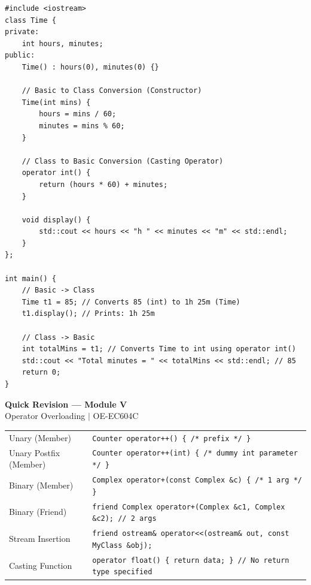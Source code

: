 \documentclass[12pt,a4paper]{article}
\renewcommand{\arraystretch}{1.45}
\begin{document}
\begin{tcolorbox}[examplebox, title={Code Example: Basic-to-Class and Class-to-Basic conversions}]
\begin{spacing}{1.0}
\begin{verbatim}
#include <iostream>
class Time {
private:
    int hours, minutes;
public:
    Time() : hours(0), minutes(0) {}
    
    // Basic to Class Conversion (Constructor)
    Time(int mins) {
        hours = mins / 60;
        minutes = mins % 60;
    }
    
    // Class to Basic Conversion (Casting Operator)
    operator int() {
        return (hours * 60) + minutes;
    }
    
    void display() {
        std::cout << hours << "h " << minutes << "m" << std::endl;
    }
};

int main() {
    // Basic -> Class
    Time t1 = 85; // Converts 85 (int) to 1h 25m (Time)
    t1.display(); // Prints: 1h 25m

    // Class -> Basic
    int totalMins = t1; // Converts Time to int using operator int()
    std::cout << "Total minutes = " << totalMins << std::endl; // 85
    return 0;
}
\end{verbatim}
\end{spacing}
\end{tcolorbox}

\newpage
\begin{center}
  {\large\bfseries\color{myred} Quick Revision --- Module V}\\[3pt]
  {\small\color{mydark} Operator Overloading $|$ OE-EC604C}
\end{center}
\noindent{\color{myred}\rule{\linewidth}{1.2pt}}
\vspace{4pt}

\begin{tcolorbox}[formulabox, title={\textbf{Key Overloading Signatures}}]
\renewcommand{\arraystretch}{1.3}
\begin{tabularx}{\linewidth}{B{3.8cm} X}
Unary (Member)           & \texttt{Counter operator++() \{ /* prefix */ \}} \\[4pt]
Unary Postfix (Member)   & \texttt{Counter operator++(int) \{ /* dummy int parameter */ \}} \\[4pt]
Binary (Member)          & \texttt{Complex operator+(const Complex \&c) \{ /* 1 arg */ \}} \\[4pt]
Binary (Friend)          & \texttt{friend Complex operator+(Complex \&c1, Complex \&c2); // 2 args} \\[4pt]
Stream Insertion         & \texttt{friend ostream\& operator<<(ostream\& out, const MyClass \&obj);} \\[4pt]
Casting Function         & \texttt{operator float() \{ return data; \} // No return type specified}
\end{tabularx}
\end{tcolorbox}
\end{document}
